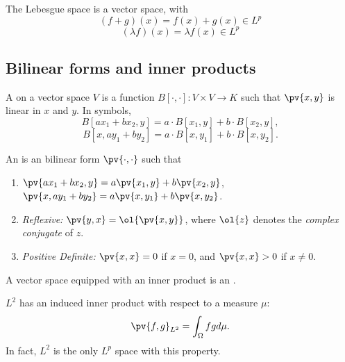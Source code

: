 \documentclass{scrartcl}
\begin{document}
\begin{proposition}
    The Lebesgue space is a vector space, with
    \[
        (f+g)(x) = f(x) + g(x) \in L^p
    \]
    \[
        (\lambda f)(x) = \lambda f(x) \in L^p
    \]
\end{proposition}

\subsection{Bilinear forms and inner products}

\begin{definition}
    A  on a vector space $V$ is a function $B[\cdot,\cdot]:V\times V \to K$ 
    such that $\pv{x,y}$ is linear in $x$ and $y$. In symbols, 
    \[
        B[ax_1 + bx_2, y] = a\cdot B[x_1,y] + b\cdot B[x_2,y], 
    \]
    \[
        B[x, ay_1+by_2] = a\cdot B[x,y_1] + b\cdot B[x,y_2].
    \]
\end{definition}

\begin{definition}
    An  is an bilinear form $\pv{\cdot, \cdot}$ such 
    that 
    \begin{enumerate}
        \item $\pv{ax_1 + bx_2, y} = a\pv{x_1,y} + b\pv{x_2,y}$, $\pv{x, ay_1+by_2} = a\pv{x,y_1} + b\pv{x,y_2}$.
        
        \item \textit{Reflexive:} $\pv{y,x} = \ol{\pv{x,y}}$, where $\ol{z}$ denotes the \textit{complex conjugate} of $z$.

        \item \textit{Positive Definite:} $\pv{x,x} = 0$ if $x = 0$, and $\pv{x,x}>0$ if $x\neq 0$.
    \end{enumerate}
    A vector space equipped with an inner product is an .
\end{definition}

\begin{example}
    $L^2$ has an induced inner product with respect to a measure $\mu$:
    \[
        \pv{f,g}_{L^2} = \int_\Omega f gd\mu.
    \]
    In fact, $L^2$ is the only $L^p$ space with this property.
\end{example}
\end{document}
